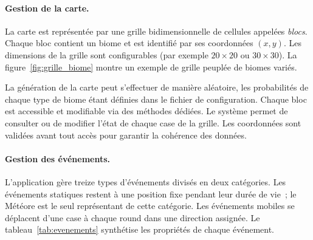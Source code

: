 \paragraph{Gestion de la carte.}
La carte est représentée par une grille bidimensionnelle de cellules appelées
\emph{blocs}. Chaque bloc contient un biome et est identifié par ses coordonnées
$(x, y)$. Les dimensions de la grille sont configurables (par exemple
$20 \times 20$ ou $30 \times 30$). La figure~\ref{fig:grille_biome} montre un
exemple de grille peuplée de biomes variés.

La génération de la carte peut s'effectuer de manière aléatoire, les probabilités
de chaque type de biome étant définies dans le fichier de configuration. Chaque bloc
est accessible et modifiable via des méthodes dédiées. Le système permet de consulter ou de modifier l'état de chaque case de la grille. Les coordonnées sont
validées avant tout accès pour garantir la cohérence des données.

\paragraph{Gestion des événements.}
L'application gère treize types d'événements divisés en deux catégories. Les
événements statiques restent à une position fixe pendant leur durée de vie~; le
Météore est le seul représentant de cette catégorie. Les événements mobiles se
déplacent d'une case à chaque round dans une direction assignée. Le
tableau~\ref{tab:evenements} synthétise les propriétés de chaque événement.

